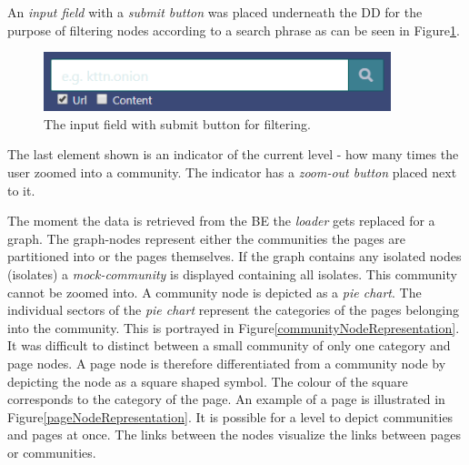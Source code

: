  An \textit{input field} with a \textit{submit button} was placed underneath the DD for the purpose of filtering nodes according to a search phrase as can be seen in Figure\ref{filterNodesElement}.
\begin{figure}[ht!]
  \centering
  \includegraphics[width=0.9\textwidth]{Images/filter.png}
  \caption{The input field with submit button for filtering.}
  \label{filterNodesElement}
\end{figure}   

The last element shown is an indicator of the current level - how many times the user zoomed into a community. The indicator has a \textit{zoom-out button} placed next to it.

The moment the data is retrieved from the BE the \textit{loader} gets replaced for a graph. The graph-nodes represent either the communities the pages are partitioned into or the pages themselves.  If the graph contains any isolated nodes (isolates) a \textit{mock-community} is displayed containing all isolates. This community cannot be zoomed into. A community node is depicted as a \textit{pie chart}. The individual sectors of the \textit{pie chart} represent the categories of the pages belonging into the community. This is portrayed in Figure\ref{communityNodeRepresentation}. It was difficult to distinct between a small community of only one category and page nodes. A page node is therefore differentiated from a community node by depicting the node as a square shaped symbol. The colour of the square corresponds to the category of the page. An example of a page is illustrated in Figure\ref{pageNodeRepresentation}. It is possible for a level to depict communities and pages at once. The links between the nodes visualize the links between pages or communities. 

